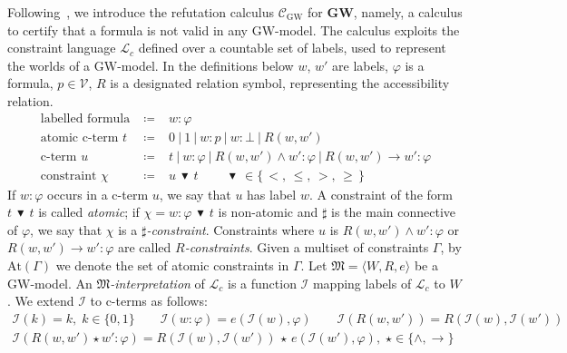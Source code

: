 \documentclass[copyright,creativecommons]{eptcs}
\newcommand{\GWL}{\mathbf{GW}}
\newcommand{\GWM}{\mbox{$\mathrm{GW}$}}
\newcommand{\Calcw}{\Ccal_{\mathrm{GW}}}
\newcommand{\LC}{\Lcal_c}
\newcommand{\PV}{\Vcal}
\newcommand{\stru}[1]{\langle #1 \rangle} %
\newcommand{\abstractorder}{\,\blacktriangledown\,}%
\newcommand{\Atm}[1]{\mathrm{At}(#1)}
\newcommand{\M}{\mathfrak{M}}
\newcommand{\G}{\Gamma}
\newcommand{\Ccal}{\mathcal{C}}
\newcommand{\Ical}{\mathcal{I}}
\newcommand{\Lcal}{\mathcal{L}}
\newcommand{\Vcal}{\mathcal{V}}
\begin{document}
Following~\cite{BilkovaFK:22,FerFioRod:2025}, we introduce the
refutation calculus $\Calcw$ for $\GWL$, namely, a calculus to certify
that a formula is not valid in any $\GWM$-model.  The calculus
exploits the constraint language $\LC$ defined over a countable set
of labels, used to represent the worlds of a \GWM-model.  In the
 definitions  below $w$, $w'$ are labels, $\varphi$  is a
formula, $p\in \PV$, $R$ is a designated relation symbol, representing
the accessibility relation.
\[
\begin{array}{rcl}
  \mbox{labelled formula} & \;\coloneqq&\; w :\varphi                            
  \\
  \mbox{atomic c-term $t$}  &\; \coloneqq&\; 0~|~1~|~w :p~|~w :\bot~|~R(w,w')
  \\[.5ex]
  \mbox{c-term $u$}  & \;\coloneqq&\; t~|~w : \varphi~|~R(w,w')\land w':\varphi~|~R(w,w')\to w':\varphi
  \\[.5ex]
  \mbox{constraint $\chi$}   &\; \coloneqq&\; u \abstractorder t \qquad \abstractorder\in \{\,<,\,\leq,\,>,\,\geq\,\}
\end{array}
\]
If  $w:\varphi$ occurs in   a c-term $u$, we say  that $u$ has label $w$.
A constraint of the form $t \abstractorder t$ is called \emph{atomic};
if $\chi= w:\varphi \abstractorder t$ is non-atomic and $\sharp$ is
the main connective of $\varphi$, we say that $\chi$ is a
\emph{$\sharp$-constraint}.
Constraints where $u$ is   $R(w,w')\land w':\varphi$ or
$R(w,w')\to w':\varphi$ are called
\emph{$R$-constraints}.
Given a multiset of constraints $\G$, by
$\Atm{\G}$ we denote the set of atomic constraints in $\G$.
Let $\M=\stru{W,R,e}$ be a \GWM-model. An \emph{$\M$-interpretation} of
$\LC$ is a function $\Ical$ mapping labels of $\LC$ to $W$.
We extend $\Ical$ to c-terms as follows:
\[
  \begin{array}{l}
    \Ical(k) = k,\;k\in\{0,1\}
    \qquad
    \Ical( w:\varphi) = e(\Ical(w), \varphi)
    \qquad
    \Ical\left(R(w,w')\right) =  R\left(\Ical(w),\Ical(w')\right)
    \\[1ex]
    \Ical\left(R(w,w') \star w':\varphi\right) =
   R\left(\Ical(w),\Ical(w')\right) \,\star\, e\left(\Ical(w'),\varphi\right),\;\star\in\{\land, \to\}
  \end{array}
\]  
\end{document}

